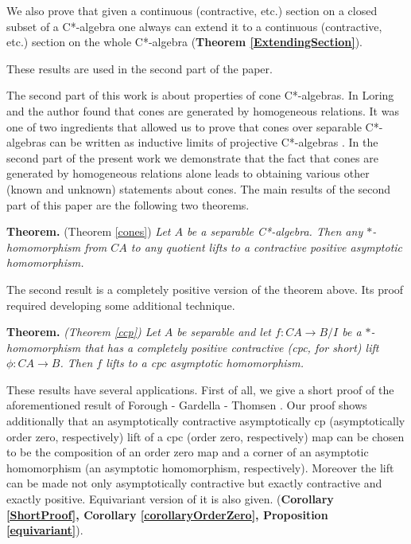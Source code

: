 \documentclass{article}%
\begin{document}
\medskip

\noindent We also prove that given a continuous  (contractive, etc.) section on a closed subset of a C*-algebra  one always can extend it to a continuous  (contractive, etc.) section on the whole C*-algebra ({\bf Theorem \ref{ExtendingSection}}).


These results are used in the second part of the paper.


The second part of this work is about properties of cone C*-algebras. In \cite{LoringShulman} Loring and the author  found that cones are generated by homogeneous relations. It was one of two ingredients that allowed us to prove that cones over separable C*-algebras can be written as inductive limits of projective C*-algebras \cite{LoringShulman}. In the second part of the present work we demonstrate that  the fact  that cones are generated by homogeneous relations alone leads to obtaining various other (known and unknown) statements about cones.  The main results of the second part of this paper are the following two theorems.

\medskip

{\bf Theorem.} (Theorem \ref{cones}) {\it Let $A$ be a  separable C*-algebra. Then any $\ast$-homomorphism from $CA$ to any quotient  lifts to a contractive positive asymptotic homomorphism.}

\medskip

The second result is a completely positive version of the theorem above. Its proof required developing some additional technique.

\medskip

{\bf Theorem.} {\it (Theorem \ref{ccp})   Let $A$ be separable and let $f: CA \to B/I$ be a $\ast$-homomorphism that has a completely positive contractive (cpc, for short) lift $\phi: CA \to B$.
 Then $f$ lifts to a cpc  asymptotic homomorphism.}

  \medskip

These results have several applications. First of all, we give a short proof of the aforementioned result of Forough - Gardella - Thomsen \cite{FGT}. Our proof shows additionally that an asymptotically contractive asymptotically cp (asymptotically order zero, respectively) lift of a cpc (order zero, respectively) map can be chosen to be the composition of an order zero map and a corner of an asymptotic homomorphism (an asymptotic homomorphism, respectively). Moreover the lift can be made not only asymptotically contractive but exactly contractive and exactly positive. Equivariant version of it is also given. ({\bf Corollary \ref{ShortProof}, Corollary \ref{corollaryOrderZero}, Proposition \ref{equivariant}}).
\end{document}
